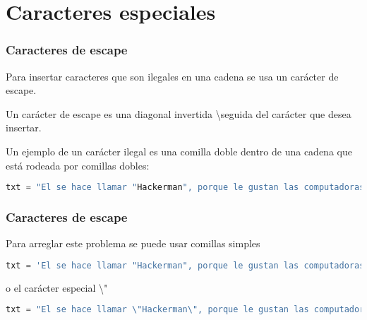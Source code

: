 \section{Caracteres especiales}

\begin{frame}[fragile]
  \frametitle{Caracteres de escape}

  Para insertar caracteres que son ilegales en una cadena se
  usa un carácter de escape.

  \vspace{\baselineskip}
  Un carácter de escape es una diagonal invertida \textbackslash  seguida del
  carácter que desea insertar.

  \vspace{\baselineskip}
  Un ejemplo de un carácter ilegal es una comilla doble dentro
  de una cadena que está rodeada por comillas dobles:

  \vspace{\baselineskip}
  \begin{lstlisting}[language=Python]
  txt = "El se hace llamar "Hackerman", porque le gustan las computadoras"
  \end{lstlisting}
\end{frame}

\begin{frame}[fragile]
  \frametitle{Caracteres de escape}

  Para arreglar este problema se puede usar comillas simples

  \vspace{\baselineskip}
  \begin{lstlisting}[language=Python]
  txt = 'El se hace llamar "Hackerman", porque le gustan las computadoras'
  \end{lstlisting}

  \vspace{\baselineskip}
  o el carácter especial \textbackslash"

  \vspace{\baselineskip}
  \begin{lstlisting}[language=Python]
  txt = "El se hace llamar \"Hackerman\", porque le gustan las computadoras"
  \end{lstlisting}
\end{frame}


